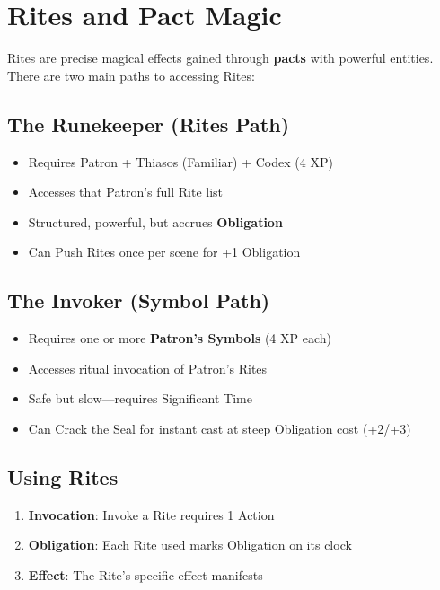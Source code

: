\section{Rites and Pact Magic}  

Rites are precise magical effects gained through \textbf{pacts} with powerful entities. There are two main paths to accessing Rites:

\subsection*{The Runekeeper (Rites Path)}
\begin{itemize}
\item Requires Patron + Thiasos (Familiar) + Codex (4 XP)
\item Accesses that Patron's full Rite list
\item Structured, powerful, but accrues \textbf{Obligation}
\item Can Push Rites once per scene for +1 Obligation
\end{itemize}

\subsection*{The Invoker (Symbol Path)}
\begin{itemize}
\item Requires one or more \textbf{Patron's Symbols} (4 XP each)
\item Accesses ritual invocation of Patron's Rites
\item Safe but slow—requires Significant Time
\item Can Crack the Seal for instant cast at steep Obligation cost (+2/+3)
\end{itemize}

\subsection*{Using Rites}
\begin{enumerate}
\item \textbf{Invocation}: Invoke a Rite requires 1 Action
\item \textbf{Obligation}: Each Rite used marks Obligation on its clock
\item \textbf{Effect}: The Rite's specific effect manifests
\end{enumerate}

